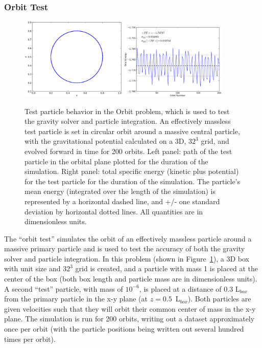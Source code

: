 \subsubsection{Orbit Test}
\label{sec.test.testorbit}

\begin{figure}
\begin{center}
\includegraphics[width=0.45\textwidth]{figures/TestOrbit_xy.eps}
\includegraphics[width=0.45\textwidth]{figures/TestOrbit_TotalEnergy.eps}
\caption{Test particle behavior in the Orbit problem, which is used to
test the gravity solver and particle integration.  An effectively
massless test particle is set in circular orbit around a massive
central particle, with the gravitational potential calculated on a 3D,
$32^3$ grid, and evolved forward in time for 200 orbits.  Left panel:
path of the test particle in the orbital plane plotted for the
duration of the simulation.  Right panel: total specific energy
(kinetic plus potential) for the test particle for the duration of the
simulation.  The particle's mean energy (integrated over the length of
the simulation) is represented by a horizontal dashed line, and +/-
one standard deviation by horizontal dotted lines.  All quantities are
in dimensionless units.}
\label{fig.orbittest}
\end{center}
\end{figure}

The ``orbit test'' simulates the orbit of an effectively massless
particle around a massive primary particle and is used to test the
accuracy of both the gravity solver and particle integration.  In this
problem (shown in Figure~\ref{fig.orbittest}), a 3D box with unit size
and $32^3$ grid is created, and a particle with mass 1 is placed at
the center of the box (both box length and particle mass are in
dimensionless units).  A second ``test'' particle, with mass of $10^{-6}$,
is placed at a distance of 0.3 L$_{box}$ from the primary particle in
the x-y plane (at $z=0.5$~L$_{box}$).  Both particles are given
velocities such that they will orbit their common center of mass in
the x-y plane.  The simulation is run for 200 orbits, writing
out a dataset 
approximately once per orbit (with the particle positions being
written out several hundred times per orbit).

